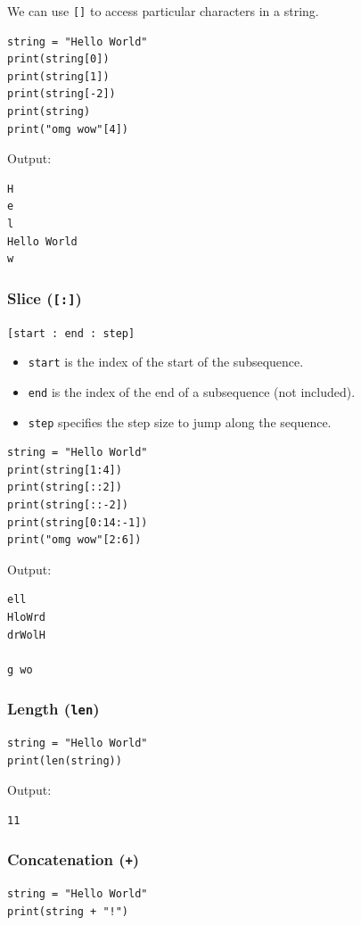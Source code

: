 \documentclass[11pt]{article}
\begin{document}
We can use \texttt{[]} to access particular characters in a string.
\begin{verbatim}
string = "Hello World"
print(string[0])
print(string[1])
print(string[-2])
print(string)
print("omg wow"[4])
\end{verbatim}

 \noindent Output:

\begin{verbatim}
H
e
l
Hello World
w
\end{verbatim}


 \newpage

\subsubsection{Slice (\texttt{[:]})}
\label{sec:org1594424}
\texttt{[start : end : step]}
\begin{itemize}
\item \texttt{start} is the index of the start of the subsequence.
\item \texttt{end} is the index of the end of a subsequence (not included).
\item \texttt{step} specifies the step size to jump along the sequence.
\end{itemize}

\begin{verbatim}
string = "Hello World"
print(string[1:4])
print(string[::2])
print(string[::-2])
print(string[0:14:-1])
print("omg wow"[2:6])
\end{verbatim}

 \noindent Output:

\begin{verbatim}
ell
HloWrd
drWolH

g wo
\end{verbatim}

\subsubsection{Length (\texttt{len})}
\label{sec:orge382b4c}
\begin{verbatim}
string = "Hello World"
print(len(string))
\end{verbatim}

 \noindent Output:

\begin{verbatim}
11
\end{verbatim}

\subsubsection{Concatenation (\texttt{+})}
\label{sec:org7cc6a00}
\begin{verbatim}
string = "Hello World"
print(string + "!")
\end{verbatim}
\end{document}
